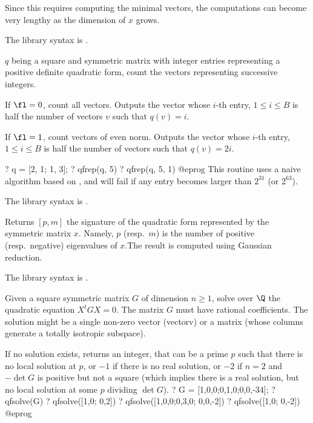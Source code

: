 Since this requires computing the minimal vectors, the computations can
become very lengthy as the dimension of $x$ grows.

The library syntax is .

\label{se:qfrep}
$q$ being a square and symmetric matrix with integer entries representing a
positive definite quadratic form, count the vectors representing successive
integers.

\item If $\fl = 0$, count all vectors. Outputs the vector whose $i$-th
entry, $1 \leq i \leq B$ is half the number of vectors $v$ such that $q(v)=i$.

\item If $\fl = 1$, count vectors of even norm. Outputs the vector
whose $i$-th entry, $1 \leq i \leq B$ is half the number of vectors such
that $q(v) = 2i$.

\bprog
? q = [2, 1; 1, 3];
? qfrep(q, 5)
? qfrep(q, 5, 1)
@eprog\noindent
This routine uses a naive algorithm based on , and
will fail if any entry becomes larger than $2^{31}$ (or $2^{63}$).

The library syntax is .

\label{se:qfsign}
Returns $[p,m]$ the signature of the quadratic form represented by the
symmetric matrix $x$. Namely, $p$ (resp.~$m$) is the number of positive
(resp.~negative) eigenvalues of $x$.The result is computed using Gaussian
reduction.

The library syntax is .

\label{se:qfsolve}
Given a square symmetric matrix $G$ of dimension $n \geq 1$, solve over
$\Q$ the quadratic equation $X^tGX = 0$. The matrix $G$ must have rational
coefficients. The solution might be a single non-zero vector (vectorv) or a
matrix (whose columns generate a totally isotropic subspace).

If no solution exists, returns an integer, that can be a prime $p$ such that
there is no local solution at $p$, or $-1$ if there is no real solution,
or $-2$ if $n = 2$ and $-\det G$ is positive but not a square (which implies
there is a real solution, but no local solution at some $p$ dividing $\det G$).
\bprog
? G = [1,0,0;0,1,0;0,0,-34];
? qfsolve(G)
? qfsolve([1,0; 0,2])
? qfsolve([1,0,0;0,3,0; 0,0,-2])
? qfsolve([1,0; 0,-2])
@eprog

